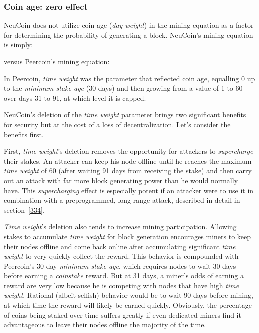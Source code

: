 \documentclass[a4paper,11pt]{article}
\begin{document}
\subsubsection*{Coin age: zero effect}

NeuCoin does not utilize coin age (\textit{day weight}) in the mining equation as a factor for determining the probability of generating a block. NeuCoin's mining equation is simply:

versus Peercoin's mining equation: 
\vspace{1mm}

In Peercoin, \textit{time weight} was the parameter that reflected coin age, equalling 0 up to the \textit{minimum stake age} (30 days) and then growing from a value of 1 to 60 over days 31 to 91, at which level it is capped.

NeuCoin's deletion of the \textit{time weight} parameter brings two significant benefits for security but at the cost of a loss of decentralization. Let's consider the benefits first.

First, \textit{time weight}'s deletion removes the opportunity for attackers to \textit{supercharge} their stakes. An attacker can keep his node offline until he reaches the maximum \textit{time weight} of 60 (after waiting 91 days from receiving the stake) and then carry out an attack with far more block generating power than he would normally have. This \textit{supercharging} effect is especially potent if an attacker were to use it in combination with a preprogrammed, long-range attack, described in detail in section~\ref{334}.

\textit{Time weight}'s deletion also tends to increase mining participation. Allowing stakes to accumulate \textit{time weight} for block generation encourages miners to keep their nodes offline and come back online after accumulating significant \textit{time weight} to very quickly collect the reward. This behavior is compounded with Peercoin's 30 day \textit{minimum stake age}, which requires nodes to wait 30 days before earning a \textit{coinstake} reward. But at 31 days, a miner's odds of earning a reward are very low because he is competing with nodes that have high \textit{time weight}. Rational (albeit selfish) behavior would be to wait 90 days before mining, at which time the reward will likely be earned quickly. Obviously, the percentage of coins being staked over time suffers greatly if even dedicated miners find it advantageous to leave their nodes offline the majority of the time.
\end{document}
